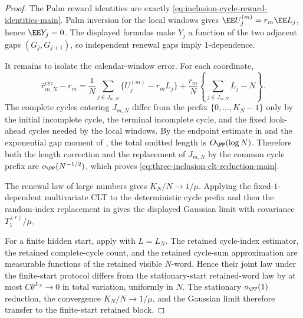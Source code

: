 \begin{proof}
The Palm reward identities are exactly
\eqref{eq:inclusion-cycle-reward-identities-main}.  Palm inversion for the
local windows gives \(\EE U_j^{(m)}=r_m\EE L_j\), hence \(\EE Y_j=0\).  The
displayed formulas make \(Y_j\) a function of the two adjacent gaps
\((G_j,G_{j+1})\), so independent renewal gaps imply \(1\)-dependence.

It remains to isolate the calendar-window error.  For each coordinate,
\[
\widehat r_{m,N}^{\mathrm{cyc}}-r_m
=
\frac1N\sum_{j\in J_{m,N}}\{U_j^{(m)}-r_mL_j\}
+\frac{r_m}{N}\left\{\sum_{j\in J_{m,N}}L_j-N\right\}.
\]
The complete cycles entering \(J_{m,N}\) differ from the prefix
\(\{0,\ldots,K_N-1\}\) only by the initial incomplete cycle, the terminal
incomplete cycle, and the fixed look-ahead cycles needed by the local
windows.  By the endpoint estimate in
 and the exponential
gap moment of , the total
omitted length is \(O_{\PP}(\log N)\).  Therefore both the length correction
and the replacement of \(J_{m,N}\) by the common cycle prefix are
\(o_{\PP}(N^{-1/2})\), which proves
\eqref{eq:three-inclusion-clt-reduction-main}.

The renewal law of large numbers gives \(K_N/N\to1/\mu\).  Applying the
fixed-\(1\)-dependent multivariate CLT to the deterministic cycle prefix and
then the random-index replacement in
 gives the displayed
Gaussian limit with covariance \(T_1^{(r)}/\mu\).

For a finite hidden start, apply
 with \(L=L_N\).  The
retained cycle-index estimator, the retained complete-cycle count, and the
retained cycle-sum approximation are measurable functions of the retained
visible \(N\)-word.  Hence their joint law under the finite-start protocol
differs from the stationary-start retained-word law by at most
\(C\theta^{L_N}\to0\) in total variation, uniformly in \(N\).  The stationary
\(o_{\PP}(1)\) reduction, the convergence \(K_N/N\to1/\mu\), and the Gaussian
limit therefore transfer to the finite-start retained block.
\end{proof}

